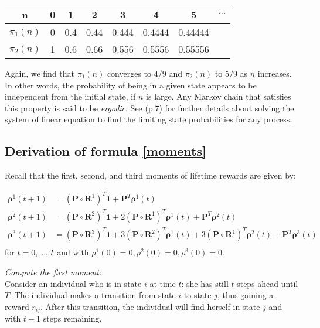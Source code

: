 \documentclass[\main/main.tex]{subfiles}
\begin{document}
\begin{small}
\begin{center} 
\begin{tabular}{ c|c|c|c|c|c|c|c  } 
 n & 0 & 1 & 2 & 3& 4 & 5 &$\cdots$ \\ 
  \hline
 $\pi_1(n)$ & 0& 0.4& 0.44& 0.444& 0.4444&0.44444 \\ 
 $\pi_2(n)$  & 1 & 0.6  & 0.66 &0.556 &0.5556&0.55556\\ 
\end{tabular}
\end{center}
Again, we find that $\pi_1(n)$ converges to $4/9$ and $\pi_2(n)$ to $5/9$ as $n$ increases. In other words, the probability of being in a given state appears to be independent from the initial state, if $n$ is large. Any Markov chain that satisfies this property is said to be \textit{ergodic}. See \cite{Howard1960} (p.7) for further details about solving the system of linear equation to find the limiting state probabilities for any process.

\end{small}



\subsection{Derivation of formula \ref{moments}}

Recall that the first, second, and third moments of lifetime rewards are given by:

\begin{equation}
    \begin{split}
     \bm{\rho}^1(t+1) &= (\mathbf{P} \circ \mathbf{R}^1) ^T\mathbf{1} + \mathbf{P}^T \bm{\rho}^1(t) \\
      \bm{\rho}^2(t+1) &= (\mathbf{P} \circ \mathbf{R}^2) ^ T\mathbf{1} + 2 (\mathbf{P} \circ \mathbf{R}^1) ^T \bm{\rho}^1(t) + 
      \mathbf{P}^T \bm{\rho}^2(t) \\
     \bm{\rho}^3(t+1) &= (\mathbf{P} \circ \mathbf{R}^3) ^ T\mathbf{1} + 3 (\mathbf{P} \circ \mathbf{R}^2) ^T \bm{\rho}^1(t) + 3 (\mathbf{P} \circ \mathbf{R}^1) ^T \bm{\rho}^2(t) + \mathbf{P}^T \bm{\rho}^3(t) \\
\end{split}
\end{equation}for $t=0, ... ,T$ and with $\rho^1(0) = 0, \rho^2(0) = 0,\rho^3(0) = 0$.

\textit{Compute the first moment:}\\

Consider an individual who is in state $i$ at time $t$: she has still $t$ steps ahead until $T$.
The individual makes a transition from state $i$ to state $j$, thus gaining a reward $r_{ij}$. After this transition, the individual will find herself in state $j$ and with $t-1$ steps remaining.\\
\end{document}
